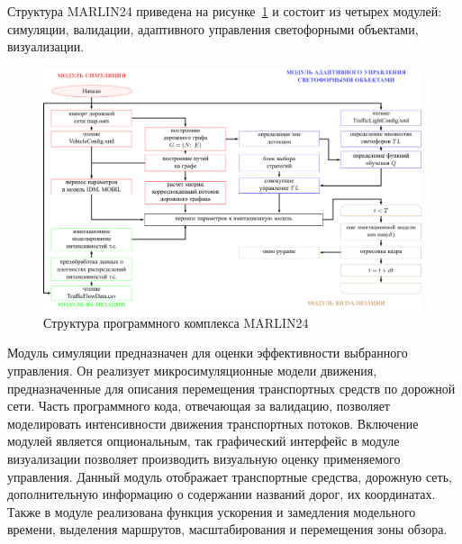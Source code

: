 \documentclass[11pt]{ubs}
\begin{document}
Структура  MARLIN24 приведена на рисунке~\ref{fig:structure_MARLIN24} и состоит из четырех модулей:  симуляции,  валидации,  адаптивного управления светофорными объектами, визуализации. 
\begin{figure}[tbph]
  \centering
  \includegraphics[width=0.99\textwidth]{structure.pdf}
  \caption{Структура программного комплекса MARLIN24}\label{fig:structure_MARLIN24}
\end{figure}


Модуль симуляции предназначен для оценки эффективности выбранного управления. 
Он реализует микросимуляционные модели движения, предназначенные для описания перемещения транспортных средств по дорожной сети. 
Часть программного кода, отвечающая за валидацию,  позволяет    моделировать интенсивности движения транспортных потоков. 
Включение модулей является опциональным, так графический интерфейс в модуле визуализации  позволяет производить визуальную оценку применяемого управления. Данный модуль отображает транспортные средства, дорожную сеть, дополнительную информацию о содержании названий дорог, их координатах. Также в модуле реализована функция ускорения и замедления модельного времени, выделения маршрутов, масштабирования и перемещения зоны обзора.











\end{document}
